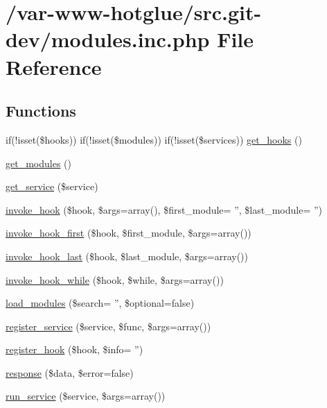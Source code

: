 \hypertarget{modules_8inc_8php}{
\section{/var-\/www-\/hotglue/src.git-\/dev/modules.inc.php File Reference}
\label{modules_8inc_8php}
}
\subsection*{Functions}
\begin{DoxyCompactItemize}
\item 
if(!isset(\$hooks)) if(!isset(\$modules)) if(!isset(\$services)) \hyperlink{modules_8inc_8php_adcaa12e356133b7fa0670571698b38cc}{get\_\-hooks} ()
\item 
\hyperlink{modules_8inc_8php_a1b73e435e11b07906d0781b146b4aa21}{get\_\-modules} ()
\item 
\hyperlink{modules_8inc_8php_abf7633223c2fd4ecb199a8e0dc070802}{get\_\-service} (\$service)
\item 
\hyperlink{modules_8inc_8php_a92ef7c094f294cfec43a3bb53227a21a}{invoke\_\-hook} (\$hook, \$args=array(), \$first\_\-module= '', \$last\_\-module= '')
\item 
\hyperlink{modules_8inc_8php_acac937809bdb98ce29616134e43050ed}{invoke\_\-hook\_\-first} (\$hook, \$first\_\-module, \$args=array())
\item 
\hyperlink{modules_8inc_8php_ae1ff036fae9d272fe1d58dff8a9caed2}{invoke\_\-hook\_\-last} (\$hook, \$last\_\-module, \$args=array())
\item 
\hyperlink{modules_8inc_8php_a66473fc9f24153d85053f1f9c6ed83e4}{invoke\_\-hook\_\-while} (\$hook, \$while, \$args=array())
\item 
\hyperlink{modules_8inc_8php_a23f8be02dc2148a3c860119a1d6ea276}{load\_\-modules} (\$search= '', \$optional=false)
\item 
\hyperlink{modules_8inc_8php_ae6ed600fb2ce39a4b0837bbb01fe8d6e}{register\_\-service} (\$service, \$func, \$args=array())
\item 
\hyperlink{modules_8inc_8php_ad91a5f96df0655d782404170324e567d}{register\_\-hook} (\$hook, \$info= '')
\item 
\hyperlink{modules_8inc_8php_a361058ff2a03c098045c4442440a2574}{response} (\$data, \$error=false)
\item 
\hyperlink{modules_8inc_8php_a3d581f1636df2e24ffe7b013a12fb1db}{run\_\-service} (\$service, \$args=array())
\end{DoxyCompactItemize}



